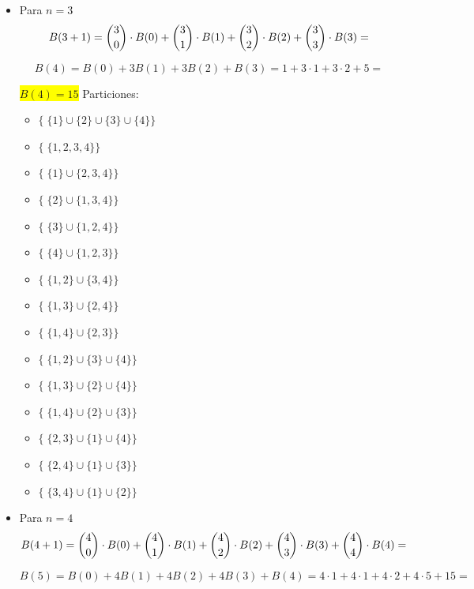 \begin{enumerate}
\begin{itemize}
        \item Para $n=3$ $$B(3+1)=\dbinom{3}{0}\cdot B(0) + \dbinom{3}{1} \cdot B(1) + \dbinom{3}{2} \cdot B(2)+ \dbinom{3}{3} \cdot B(3)=$$

        $$B(4)= B(0) + 3B(1) + 3B(2) + B(3)= 1 + 3 \cdot 1+  3 \cdot 2 + 5 =$$

        \colorbox{yellow}{$B(4)=15$}
        Particiones: 
            \begin{itemize}
                \item $\{\; \{1\}\cup \{2\} \cup \{3\} \cup \{4\}\}$
                \item $\{\; \{1, 2, 3, 4\}\} $
                \item $\{\; \{1\}\cup \{2,3,4\}\}$
                \item $\{\; \{2\} \cup \{1,3,4\}\}$
                \item $\{\; \{3\} \cup \{1,2,4\}\}$
                \item $\{\; \{4\} \cup \{1,2,3\}\}$
                \item $\{\; \{1,2\} \cup \{3,4\}\}$
                \item $\{\; \{1,3\} \cup \{2,4\}\}$
                \item $\{\; \{1,4\} \cup \{2,3\}\}$
                \item $\{\; \{1,2\} \cup \{3\} \cup \{4\} \}$
            \item $\{\; \{1,3\} \cup \{2\} \cup \{4\} \}$
                \item $\{\; \{1,4\} \cup \{2\} \cup \{3\} \}$
                \item $\{\; \{2,3\} \cup \{1\} \cup \{4\} \}$
                \item $\{\; \{2,4\} \cup \{1\} \cup \{3\} \}$
                \item $\{\; \{3,4\} \cup \{1\} \cup \{2\} \}$
            \end{itemize}
        
        \item Para $n=4$ $$B(4+1)=\dbinom{4}{0}\cdot B(0) + \dbinom{4}{1} \cdot B(1) + \dbinom{4}{2} \cdot B(2)+ \dbinom{4}{3} \cdot B(3) + \dbinom{4}{4} \cdot B(4)=$$

        $$B(5)= B(0) + 4B(1) + 4B(2) + 4B(3) + B(4)= 4 \cdot 1 + 4 \cdot 1+  4 \cdot 2 + 4 \cdot 5 + 15 =$$


\end{itemize}
\end{enumerate}
